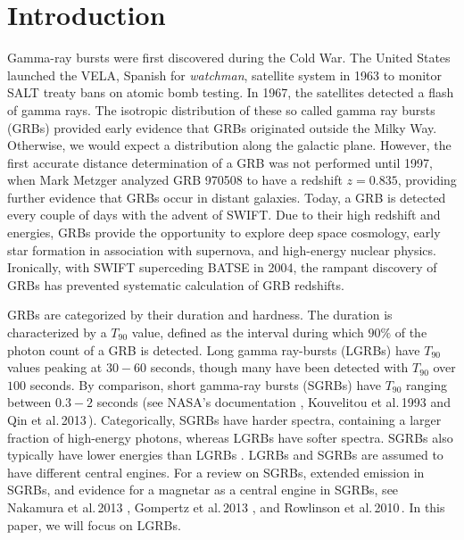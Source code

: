 \documentclass{article}
\begin{document}
\newpage
\thispagestyle{empty}
\mbox{}
\newpage

{\centering\tableofcontents}
\setcounter{page}{1}
\newpage
\thispagestyle{empty}
\mbox{}
\newpage

\section{Introduction}
Gamma-ray bursts were first discovered during the Cold War. The United States launched the VELA, Spanish for \textit{watchman}, satellite system in 1963 to monitor SALT treaty bans on atomic bomb testing. In 1967, the satellites detected a flash of gamma rays. The isotropic distribution of these so called gamma ray bursts (GRBs) provided early evidence that GRBs originated outside the Milky Way. Otherwise, we would expect a distribution along the galactic plane. However, the first accurate distance determination of a GRB was not performed until 1997, when Mark Metzger analyzed GRB 970508 to have a redshift $z=0.835$, providing further evidence that GRBs occur in distant galaxies. Today, a GRB is detected every couple of days with the advent of SWIFT. Due to their high redshift and energies, GRBs provide the opportunity to explore deep space cosmology, early star formation in association with supernova, and high-energy nuclear physics. Ironically, with SWIFT superceding BATSE in 2004, the rampant discovery of GRBs has prevented systematic calculation of GRB redshifts.

GRBs are categorized by their duration and hardness. The duration is characterized by a $T_{90}$ value, defined as the interval during which $90\%$ of the photon count of a GRB is detected. Long gamma ray-bursts (LGRBs) have $T_{90}$ values peaking at $30-60$ seconds, though many have been detected with $T_{90}$ over $100$ seconds. By comparison, short gamma-ray bursts (SGRBs) have $T_{90}$ ranging between $0.3-2$ seconds (see NASA's documentation  \cite{bworld}, Kouvelitou et al.\,1993  \cite{Kouv:1993ap} and Qin et al.\,2013\,\cite{Qin:2013}). Categorically, SGRBs have harder spectra, containing a larger fraction of high-energy photons, whereas LGRBs have softer spectra. SGRBs also typically have lower energies than LGRBs \cite{Levan:2007tf}. LGRBs and SGRBs are assumed to have different central engines. For a review on SGRBs, extended emission in SGRBs, and evidence for a magnetar as a central engine in SGRBs, see Nakamura et al.\,2013 \cite{Nakamura:2013hda}, Gompertz et al.\,2013 \cite{Gompertz:2013aka}, and Rowlinson et al.\,2010\,\cite{rowlin:2010}. In this paper, we will focus on LGRBs.
\end{document}
